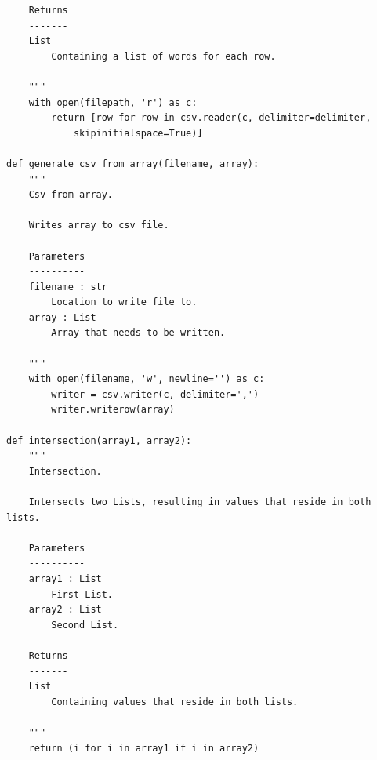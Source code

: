 \documentclass[journal]{IEEEtran}
\begin{document}
\begin{lstlisting}
    Returns
    -------
    List
        Containing a list of words for each row.

    """
    with open(filepath, 'r') as c:
        return [row for row in csv.reader(c, delimiter=delimiter,
            skipinitialspace=True)]

def generate_csv_from_array(filename, array):
    """
    Csv from array.

    Writes array to csv file.

    Parameters
    ----------
    filename : str
        Location to write file to.
    array : List
        Array that needs to be written.

    """
    with open(filename, 'w', newline='') as c:
        writer = csv.writer(c, delimiter=',')
        writer.writerow(array)

def intersection(array1, array2):
    """
    Intersection.

    Intersects two Lists, resulting in values that reside in both lists.

    Parameters
    ----------
    array1 : List
        First List.
    array2 : List
        Second List.

    Returns
    -------
    List
        Containing values that reside in both lists.

    """
    return (i for i in array1 if i in array2)
\end{lstlisting}
\end{document}
